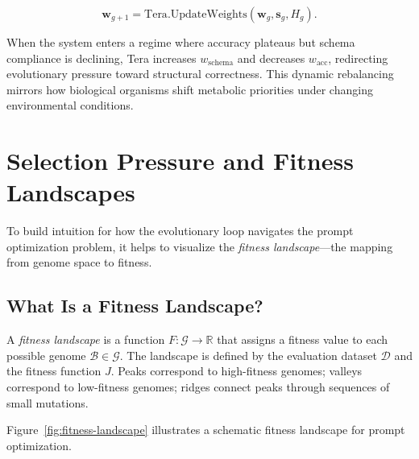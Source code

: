 \begin{equation}
\mathbf{w}_{g+1} = \text{Tera}.\text{UpdateWeights}(\mathbf{w}_g, \mathbf{s}_g, H_g).
\label{eq:tera-weights}
\end{equation}

When the system enters a regime where accuracy plateaus but schema compliance is declining, Tera increases $w_{\text{schema}}$ and decreases $w_{\text{acc}}$, redirecting evolutionary pressure toward structural correctness. This dynamic rebalancing mirrors how biological organisms shift metabolic priorities under changing environmental conditions.

\section{Selection Pressure and Fitness Landscapes}
\label{sec:fitness-landscapes}

To build intuition for how the evolutionary loop navigates the prompt optimization problem, it helps to visualize the \emph{fitness landscape}---the mapping from genome space to fitness.

\subsection{What Is a Fitness Landscape?}

\begin{dogmadef}
A \emph{fitness landscape} is a function $F: \mathcal{G} \to \mathbb{R}$ that assigns a fitness value to each possible genome $\mathcal{B} \in \mathcal{G}$. The landscape is defined by the evaluation dataset $\mathcal{D}$ and the fitness function $J$. Peaks correspond to high-fitness genomes; valleys correspond to low-fitness genomes; ridges connect peaks through sequences of small mutations.
\end{dogmadef}

Figure~\ref{fig:fitness-landscape} illustrates a schematic fitness landscape for prompt optimization.

